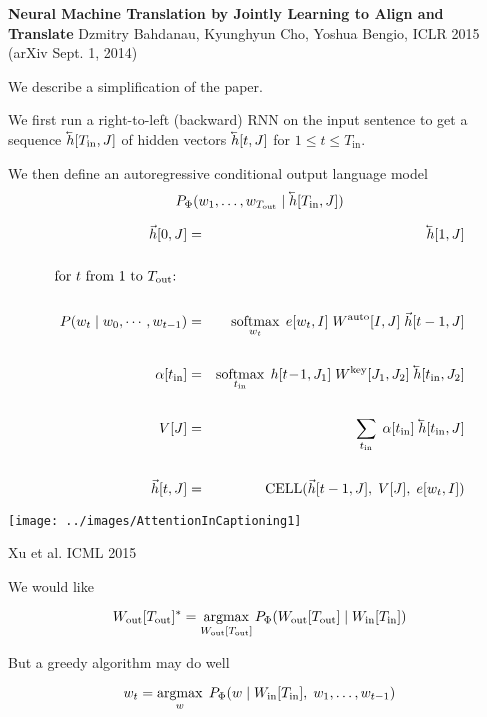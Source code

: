 {{\bf Neural Machine Translation by Jointly Learning to {\color{red} Align} and Translate}
Dzmitry Bahdanau, Kyunghyun Cho, Yoshua Bengio, ICLR 2015 (arXiv Sept. 1, 2014)

\vfill
We describe a simplification of the paper.

We first run a right-to-left (backward) RNN on the
input sentence to get a sequence $\cev{h}[T_{\mathrm{in}},J]$ of hidden vectors $\cev{h}[t,J]$ for $1 \leq t \leq T_{\mathrm{in}}$.

\vfill
We then define an autoregressive conditional output language model
$$P_\Phi(w_1,\ldots,w_{T_\mathrm{out}}\;|\; \cev{h}[T_{\mathrm{in}},J])$$

\begin{eqnarray*}
  \vec{h}[0,J] & = & \cev{h}[1,J] \\
  \\
  \mbox{for $t$ from $1$ to $T_{\mathrm{out}}$: \vspace{3.0 in} ~} \\
  \\
P(w_t\;|\;w_0,\cdots,w_{t-1}) & = & \softmax_{w_t}\;e[w_t,I]\;W^{\mathrm{auto}}[I,J]\;\vec{h}[t-1,J] \\
\\
\alpha[t_{\mathrm{in}}]& =& \softmax_{t_\mathrm{in}} \;h[t\!-\!1,J_1]\;W^{\mathrm{key}}[J_1,J_2]\;\cev{h}[t_{\mathrm{in}},J_2]\\
\\
V[J]& = & \sum_{t_{\mathrm{in}}}\;\alpha[t_{\mathrm{in}}]\;\cev{h}[t_{\mathrm{in}},J] \\
\\
\vec{h}[t,J] & = & \mathrm{CELL}(\vec{h}[t-1,J],\;V[J],\;e[w_t,I])
\end{eqnarray*}


\centerline{\texttt{[image: ../images/AttentionInCaptioning1]}}
\centerline{Xu et al. ICML 2015}


We would like

\vfill
$$W_{\mathrm{out}}[T_{\mathrm{out}}]^* = \operatorname*{argmax}_{W_{\mathrm{out}}[T_{\mathrm{out}}]}
P_\Phi(W_{\mathrm{out}}[T_{\mathrm{out}}] \;|\;W_{\mathrm{in}}[T_{\mathrm{in}}])$$

\vfill
But a greedy algorithm may do well

\vfill
$$w_t = \operatorname*{argmax}_w\; P_\Phi(w\;|\;W_{\mathrm{in}}[T_{\mathrm{in}}],\;w_1,\ldots,w_{t-1})$$

}
